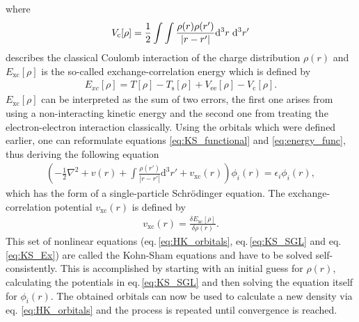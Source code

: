 where 
\begin{align}
    V_{\mathrm{c}}[\rho] = \frac{1}{2}\int\int\frac{\rho(r) \rho(r')}{|r-r'|} \mathrm{d}^{3}r \hspace{0.1 cm} \mathrm{d}^{3}r'
\end{align}
describes the classical Coulomb interaction of the charge distribution $\rho(r)$ and $E_{\mathrm{xc}}[\rho]$ is the so-called exchange-correlation energy which is defined by 
\begin{align}
    E_{xc}[\rho] = T[\rho] - T_{\mathrm{s}}[\rho] + V_{\mathrm{ee}}[\rho] - V_{\mathrm{c}}[\rho].
\end{align}
$E_{\mathrm{xc}}[\rho]$ can be interpreted as the sum of two errors, the first one arises from using a non-interacting kinetic energy and the second one from treating the electron-electron interaction classically. 
Using the orbitals which were defined earlier, one can reformulate equations \ref{eq:KS_functional} and \ref{eq:energy_func}, thus deriving the following equation
\begin{align} \label{eq:KS_SGL}
    \left(-\frac{1}{2}\nabla^{2} + v(r) + \int\frac{\rho(r')}{|r-r'|} \mathrm{d}^{3}r' + v_{\mathrm{xc}}(r)\right)\phi_i(r) = \epsilon_i \phi_i(r),
\end{align}
which has the form of a single-particle Schrödinger equation. The exchange-correlation potential $v_{\mathrm{xc}}(r)$ is defined by 
\begin{align} \label{eq:KS_Ex}
    v_{\mathrm{xc}}(r) = \frac{\delta E_{\mathrm{xc}}[\rho]}{\delta \rho(r)}.
\end{align}
This set of nonlinear equations (eq.\,\ref{eq:HK_orbitals}, eq.\,\ref{eq:KS_SGL} and eq.\,\ref{eq:KS_Ex}) are called the Kohn-Sham equations and have to be solved self-consistently. This is accomplished by starting with an initial guess for $\rho(r)$, calculating the potentials in eq.\,\ref{eq:KS_SGL} and then solving the equation itself for $\phi_i(r)$. The obtained orbitals can now be used to calculate a new density via eq. \ref{eq:HK_orbitals} and the process is repeated until convergence is reached.




